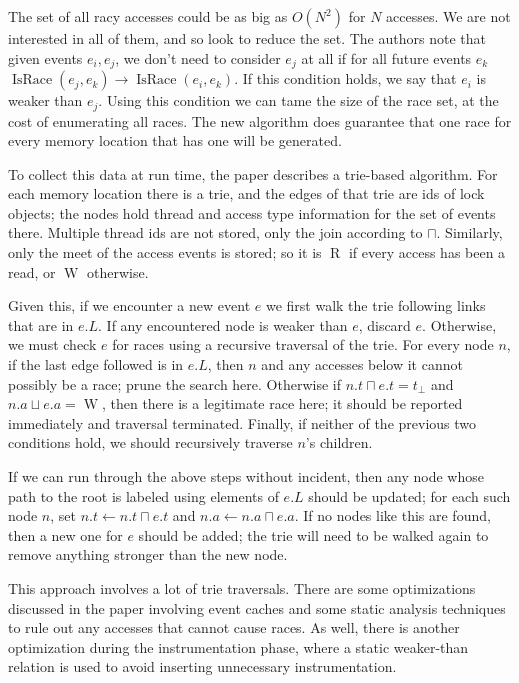 \documentclass{article}
\DeclareMathOperator{\READ}{R}
\DeclareMathOperator{\WRITE}{W}
\DeclareMathOperator{\IsRace}{IsRace}
\begin{document}
\begin{multicols}{2}
The set of all racy accesses could be as big as $O(N^2)$ for $N$
accesses.  We are not interested in all of them, and so look to reduce
the set.  The authors note that given events $e_i, e_j$, we don't need
to consider $e_j$ at all if for all future events $e_k$ $\IsRace (e_j,
e_k) \rightarrow \IsRace (e_i, e_k)$.  If this condition holds, we say
that $e_i$ is weaker than $e_j$.  Using this condition we can tame the
size of the race set, at the cost of enumerating all races.  The new
algorithm does guarantee that one race for every memory location that
has one will be generated.

To collect this data at run time, the paper describes a trie-based
algorithm.  For each memory location there is a trie, and the edges of
that trie are ids of lock objects; the nodes hold thread and access
type information for the set of events there.  Multiple thread ids are
not stored, only the join according to $\sqcap$.  Similarly, only the
meet of the access events is stored; so it is $\READ$ if every access
has been a read, or $\WRITE$ otherwise.

Given this, if we encounter a new event $e$ we first walk the trie
following links that are in $e.L$.  If any encountered node is weaker
than $e$, discard $e$.  Otherwise, we must check $e$ for races using a
recursive traversal of the trie.  For every node $n$, if the last edge
followed is in $e.L$, then $n$ and any accesses below it cannot
possibly be a race; prune the search here.  Otherwise if $n.t \sqcap
e.t = t_\bot$ and $n.a \sqcup e.a = \WRITE$, then there is a
legitimate race here; it should be reported immediately and traversal
terminated.  Finally, if neither of the previous two conditions hold,
we should recursively traverse $n$'s children.

If we can run through the above steps without incident, then any node
whose path to the root is labeled using elements of $e.L$ should be
updated; for each such node $n$, set $n.t \leftarrow n.t \sqcap e.t$
and $n.a \leftarrow n.a \sqcap e.a$.  If no nodes like this are found,
then a new one for $e$ should be added; the trie will need to be
walked again to remove anything stronger than the new node.

This approach involves a lot of trie traversals.  There are some
optimizations discussed in the paper involving event caches and some
static analysis techniques to rule out any accesses that cannot cause
races.  As well, there is another optimization during the
instrumentation phase, where a static weaker-than relation is used to
avoid inserting unnecessary instrumentation.


\end{multicols}
\end{document}
